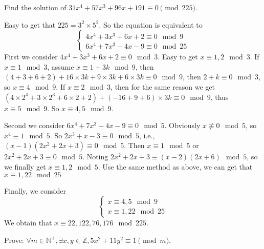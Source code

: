 \documentclass{ctexart}
\begin{document}
\begin{problem}\label{pro:2}
  Find the solution of \(31x^4 + 57x^3 + 96x + 191 \equiv 0 \pmod{ 225}\).
\end{problem}
\begin{solution}
  Easy to get that \(225 = 3^2 \times 5^2\).
  So the equation is equivalent to
  \[
    \begin{cases}
      4 x^4+3x^3+6x+2 \equiv 0 \mod 9 \\
      6 x^4 + 7 x^3 -4x-9 \equiv 0 \mod 25
    \end{cases}
  \]
  First we consider \(4x^4+3x^3+6x+2 \equiv 0 \mod 3\).
  Easy to get \(x \equiv 1,2 \mod 3\).
  If \(x \equiv 1 \mod 3\), assume \(x \equiv 1+3k \mod 9\), then \((4+3+6+2)+16 \times 3k + 9 \times 3k + 6 \times 3k \equiv 0 \mod 9\),
  then \(2+k \equiv 0 \mod 3\), so \(x \equiv 4 \mod 9\).
  If \(x \equiv 2 \mod 3\), then for the same reason we get \((4\times 2^4+3\times 2^3+6\times 2+2)+(-16+9+6)\times 3k \equiv 0 \mod 9\),
  thus \(x \equiv 5 \mod 9\). So \(x \equiv 4,5 \mod 9\).

  Second we consider \(6 x^4 + 7 x^3 -4x-9 \equiv 0 \mod 5\). Obviously \(x \not \equiv 0 \mod 5\), so \(x^4 \equiv 1 \mod 5\).
  So \(2x^3+x-3 \equiv 0 \mod 5\), i.e., \((x-1)(2x^2+2x+3) \equiv 0 \mod 5\). Then \(x \equiv 1 \mod 5\) or \(2x^2+2x+3 \equiv 0 \mod 5\).
  Noting \(2x^2+2x+3 \equiv (x-2)(2x+6) \mod 5\), so we finally get \(x \equiv 1,2 \mod 5\).
  Use the same method as above, we can get that \(x \equiv 1,22 \mod 25\)

  Finally, we consider
  \[
    \begin{cases}
      x \equiv 4,5 \mod 9 \\
      x \equiv 1,22 \mod 25
    \end{cases}
  \]
  We obtain that \(x \equiv 22,122,76,176 \mod 225\).
\end{solution}
\begin{problem}\label{pro:3}
  Prove: \(\forall m \in \mathbb{N}^+,\exists x,y \in \mathbb{Z},5x^2 + 11y^2 \equiv 1 \pmod{ m}\).
\end{problem}
\end{document}
